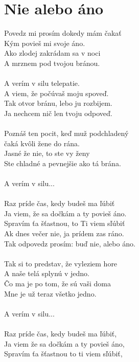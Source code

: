 \section{Nie alebo áno}
\begin{multicols}{2}
Povedz mi prosím dokedy mám čakať\\
Kým povieš mi svoje áno.\\
Ako zlodej zakrádam sa v noci\\
A mrznem pod tvojou bránou.\\
\\
A verím v silu telepatie.\\
A viem, že počúvaš moju spoveď.\\
Tak otvor bránu, lebo ju rozbijem.\\
Ja nechcem nič len tvoju odpoveď.\\
\\
Poznáš ten pocit, keď muž podchladený\\
čaká kvôli žene do rána.\\
Jasné že nie, to ste vy ženy\\
Ste chladné a pevnejšie ako tá brána.\\
\\
A verím v silu...\\
\\
Raz príde čas, kedy budeš ma ľúbiť\\
Ja viem, že sa dočkám a ty povieš áno.\\
Spravím ťa šťastnou, to Ti viem sľúbiť\\
Ak dnes večer nie, ja prídem zas ráno.\\
Tak odpovedz prosím: buď nie, alebo áno.\\
\\
Tak si to predstav, že vyleziem hore\\
A naše telá splynú v jedno.\\
Čo ma je po tom, že sú vaši doma\\
Mne je už teraz všetko jedno.\\
\\
A verím v silu...\\
\columnbreak
\\
Raz príde čas, kedy budeš ma ľúbiť,\\
Ja viem že sa dočkám a ty povieš áno,\\
Spravím ťa šťastnou to ti viem sľúbiť,\\

\end{multicols}
